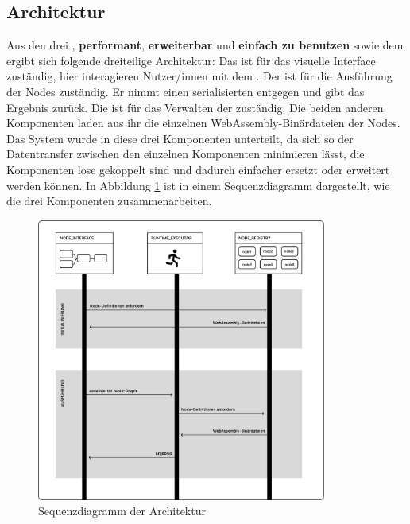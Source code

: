 \documentclass[ngerman]{article}
\begin{document}
\pagebreak


\subsection{Architektur}
\label{sec:Architektur}
Aus den drei , \textbf{performant}, \textbf{erweiterbar} und \textbf{einfach zu benutzen} sowie dem  ergibt sich folgende dreiteilige Architektur:
\br
Das \textbf{} ist für das visuelle Interface zuständig, hier interagieren Nutzer/innen mit dem .
\br
Der \textbf{} ist für die Ausführung der Nodes zuständig. Er nimmt einen serialisierten  entgegen und gibt das Ergebnis zurück.
\br
Die \textbf{} ist für das Verwalten der  zuständig. Die beiden anderen Komponenten laden aus ihr die einzelnen WebAssembly-Binärdateien der Nodes.
\br
Das System wurde in diese drei Komponenten unterteilt, da sich so der Datentransfer zwischen den einzelnen Komponenten minimieren lässt, die Komponenten lose gekoppelt sind und dadurch einfacher ersetzt oder erweitert werden können.
In Abbildung \ref{fig:overview_sequence} ist in einem Sequenzdiagramm dargestellt, wie die drei Komponenten zusammenarbeiten.

\begin{figure}[hbtp]
    \centering
    \includegraphics[width=0.85\textwidth]{graphics/OVERVIEW_SEQUENCE.pdf}
    \caption{Sequenzdiagramm der Architektur}
    \label{fig:overview_sequence}
\end{figure}
\end{document}
